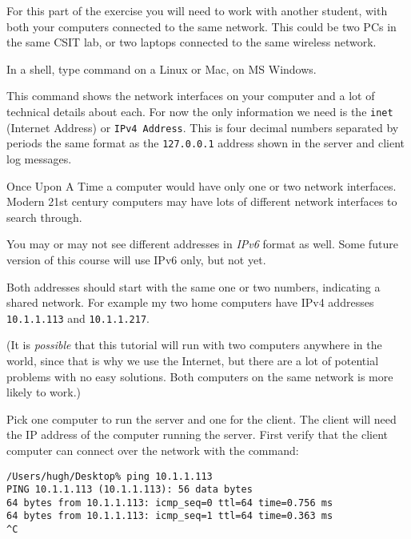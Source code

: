 
For this part of the exercise you will need to work with another student, with both your
computers connected to the same network. This could be two PCs in the same CSIT lab, or
two laptops connected to the same wireless network.

In a shell, type command  on a Linux or Mac,  on MS Windows.

This command shows the network interfaces on your computer and a lot of technical details
about each. For now the only information we need is the \texttt{inet} (Internet Address)
or \texttt{IPv4 Address}. This is four decimal numbers separated by periods \DSH the same
format as the \texttt{127.0.0.1} address shown in the server and client log messages.

\begin{IMPORTANT}
Once Upon A Time a computer would have only one or two network interfaces. Modern 21st
century computers may have lots of different network interfaces to search through.

You may or may not see different addresses in \emph{IPv6} format as well. Some future version
of this course will use IPv6 only, but not yet.
\end{IMPORTANT}

Both addresses should start with the same one or two numbers, indicating a shared network.
For example my two home computers have IPv4 addresses \texttt{10.1.1.113}
and \texttt{10.1.1.217}.

(It is \emph{possible} that this tutorial will run with two computers anywhere in the world,
since that is why we use the Internet, but there are a lot of potential problems
with no easy solutions. Both computers on the same network is more likely to work.)

Pick one computer to run the server and one for the client. The client will need the IP
address of the computer running the server. First verify that the client computer can
connect over the network with the  command:

\begin{CODE}\begin{verbatim}
/Users/hugh/Desktop% ping 10.1.1.113
PING 10.1.1.113 (10.1.1.113): 56 data bytes
64 bytes from 10.1.1.113: icmp_seq=0 ttl=64 time=0.756 ms
64 bytes from 10.1.1.113: icmp_seq=1 ttl=64 time=0.363 ms
^C
\end{verbatim}\end{CODE}

